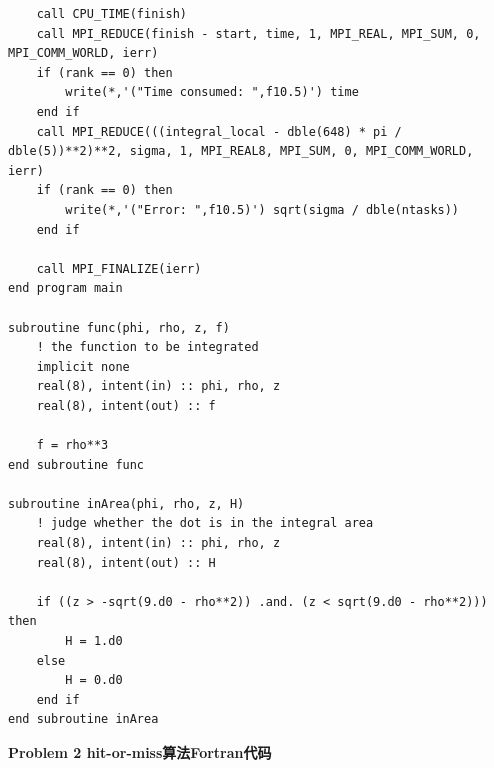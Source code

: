 \documentclass[UTF8,10pt,a4paper]{article}
\theoremstyle{Problem}
\theoremstyle{Solution}
\begin{document}
\begin{lstlisting}
    call CPU_TIME(finish)
    call MPI_REDUCE(finish - start, time, 1, MPI_REAL, MPI_SUM, 0, MPI_COMM_WORLD, ierr)
    if (rank == 0) then
        write(*,'("Time consumed: ",f10.5)') time
    end if
    call MPI_REDUCE(((integral_local - dble(648) * pi / dble(5))**2)**2, sigma, 1, MPI_REAL8, MPI_SUM, 0, MPI_COMM_WORLD, ierr)
    if (rank == 0) then
        write(*,'("Error: ",f10.5)') sqrt(sigma / dble(ntasks))
    end if

    call MPI_FINALIZE(ierr)
end program main

subroutine func(phi, rho, z, f)
    ! the function to be integrated
    implicit none
    real(8), intent(in) :: phi, rho, z
    real(8), intent(out) :: f

    f = rho**3
end subroutine func

subroutine inArea(phi, rho, z, H)
    ! judge whether the dot is in the integral area
    real(8), intent(in) :: phi, rho, z
    real(8), intent(out) :: H

    if ((z > -sqrt(9.d0 - rho**2)) .and. (z < sqrt(9.d0 - rho**2))) then
        H = 1.d0
    else
        H = 0.d0
    end if
end subroutine inArea
\end{lstlisting}
\textbf{Problem 2 hit-or-miss算法Fortran代码}
\end{document}
